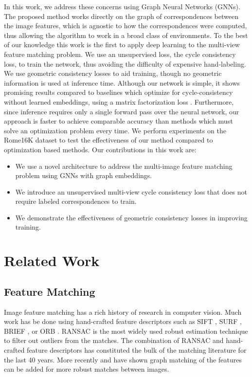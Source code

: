 \documentclass{article} %
\begin{document}
In this work, we address these concerns using Graph Neural Networks (GNNs).
The proposed method works directly on the graph of correspondences between the image features, which is agnostic to how the correspondences were computed, thus allowing the algorithm to work in a broad class of environments.
To the best of our knowledge this work is the first to apply deep learning to the multi-view feature matching problem.
We use an unsupervised loss, the cycle consistency loss, to train the network, thus avoiding the difficulty of expensive hand-labeling.
We use geometric consistency losses to aid training, though no geometric information is used at inference time.
Although our network is simple, it shows promising results compared to baselines which optimize for cycle-consistency without learned embeddings, using a matrix factorization loss \citep{zhou2015multi, leonardos2016distributed}.
Furthermore, since inference requires only a single forward pass over the neural network, our approach is faster to achieve comparable accuracy than methods which must solve an optimization problem every time.
We perform experiments on the Rome16K dataset \citep{li2010location} to test the effectiveness of our method compared to optimization based methods.
Our contributions in this work are:
\begin{itemize}
\item We use a novel architecture to address the multi-image feature matching problem using GNNs with graph embeddings.
\item We introduce an unsupervised multi-view cycle consistency loss that does not require labeled correspondences to train.
\item We demonstrate the effectiveness of geometric consistency losses in improving training.
\end{itemize}


\section{Related Work}

\subsection{Feature Matching}
Image feature matching has a rich history of research in computer vision.
Much work has be done using hand-crafted feature descriptors such as SIFT \citep{lowe2004distinctive}, SURF \citep{bay2006surf}, BRIEF \citep{calonder2012brief}, or ORB \citep{mur2015orb}.
RANSAC \cite{fischler1981random} is the most widely used robust estimation technique to filter out outliers from the matches.
The combination of RANSAC and hand-crafted feature descriptors has constituted the bulk of the matching literature for the last 40 years.
More recently \cite{suh2015subgraph} and \cite{hu2016distributable} have shown graph matching of the features can be added for more robust matches between images.
\end{document}
